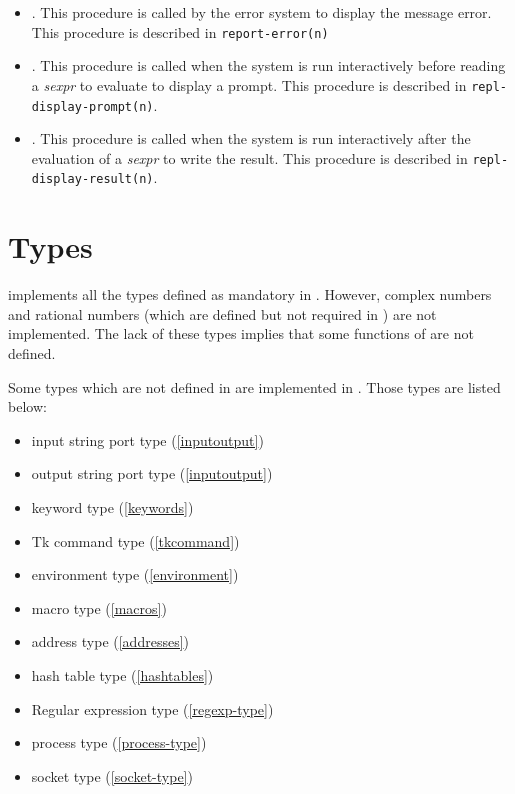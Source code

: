 \begin{itemize}
\item {}. This procedure is called by the error system to 
  display the message error. This procedure is described in 
  {\tt report-error(n)}

\item {}. \label{repl-display-prompt} 
  This procedure is called when the system 
  is run interactively before reading a \emph{sexpr} to evaluate to display 
  a prompt. This procedure is described in  {\tt repl-display-prompt(n)}.

\item {}. This procedure is called when the system 
  is run interactively after the evaluation of a \emph{sexpr} to write the
  result. This procedure is described in  {\tt repl-display-result(n)}.

\end{itemize}



\section{Types}

{\stk} implements all the types defined as mandatory in {\rrrr}. However, complex
numbers and rational numbers (which are defined but not required in \rrrr) are
not implemented. The lack of these types implies that some functions of
{\rrrr} are not defined.

Some types which are not defined in {\rrrr} are implemented in {\stk}. Those 
types are listed below:
\begin{itemize}
\item input string port type (\ref{inputoutput})
\item output string port type (\ref{inputoutput})
\item keyword type (\ref{keywords})
\item Tk command type (\ref{tkcommand})
\item environment type (\ref{environment})
\item macro type (\ref{macros})
\item address type (\ref{addresses})
\item hash table type (\ref{hashtables})
\item Regular expression type (\ref{regexp-type})
\item process type (\ref{process-type})
\item socket type (\ref{socket-type})
\end{itemize}

